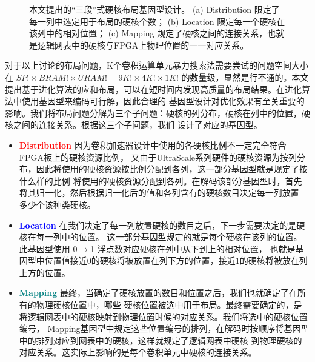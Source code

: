 \begin{figure}[t]

	\caption{
		本文提出的“三段”式硬核布局基因型设计。
		(a) Distribution 限定了每一列中选定用于布局的硬核个数；
		(b) Location 限定每一个硬核在该列中的相对位置；
		(c) Mapping 规定了硬核之间的连接关系，也就是逻辑网表中的硬核与FPGA上物理位置的一一对应关系。
	}
	
	

	\label{fig:genotype}
  \vspace{-0.2in}
\end{figure}

对于以上讨论的布局问题，K个卷积运算单元暴力搜索法需要尝试的问题空间大小在 $SP! \times BRAM! \times URAM! = 9K!\times4K!\times1K!$
的数量级，显然是行不通的。本文提出基于进化算法的应和布局，可以在短时间内发现高质量的布局结果。在进化算法中使用基因型来编码可行解，因此合理的
基因型设计对优化效果有至关重要的影响。我们将布局问题分解为三个子问题：硬核的列分布，硬核在列中的位置，硬核之间的连接关系。根据这三个子问题，我们
设计了对应的基因型。

\begin{itemize}
	\item \textcolor{red}{\bf Distribution} 因为卷积加速器设计中使用的各硬核比例不一定完全符合FPGA板上的硬核资源比例，
		又由于UltraScale系列硬件的硬核资源为按列分布，因此将使用的硬核资源按比例分配到各列，这一部分基因型就是规定了按什么样的比例
		将使用的硬核资源分配到各列。在解码该部分基因型时，首先将其归一化，然后根据归一化后的值和各列含有的硬核数目决定每一列放置
		多少个该种类硬核。
	\item \textcolor{blue}{\bf Location} 在我们决定了每一列放置硬核的数目之后，下一步需要决定的是硬核在每一列中的位置。
		这一部分基因型规定的就是每个硬核在该列的位置。此基因型使用 0$\rightarrow$1 浮点数对应硬核在列中从下到上的相对位置，
		也就是基因型中位置值接近0的硬核将被放置在列下方的位置，接近1的硬核将被放在列上方的位置。
	\item \textcolor{teal}{\bf Mapping} 最终，当确定了硬核放置的数目和位置之后，我们也就确定了在所有的物理硬核位置中，哪些
		硬核位置被选中用于布局。最终需要确定的，是将逻辑网表中的硬核映射到物理位置时候的对应关系。我们将选中的硬核位置编号，
		Mapping基因型中规定这些位置编号的排列，在解码时按顺序将基因型中的排列对应到网表中的硬核，这样就规定了逻辑网表中硬核
		到物理硬核的对应关系。这实际上影响的是每个卷积单元中硬核的连接关系。
\end{itemize}

